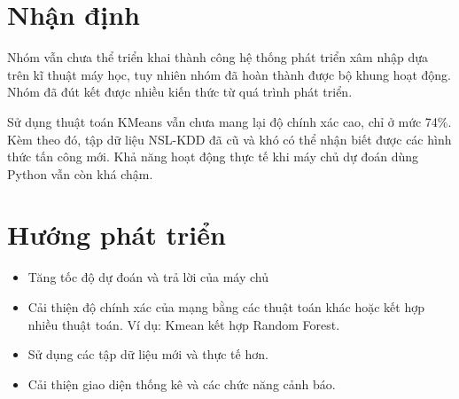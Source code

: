 \section{Nhận định}
Nhóm vẫn chưa thể triển khai thành công hệ thống phát triển xâm nhập dựa trên kĩ thuật máy học, tuy nhiên 
nhóm đã hoàn thành được bộ khung hoạt động. Nhóm đã đút kết được nhiều kiến thức từ quá trình phát triển.
\par
Sử dụng thuật toán KMeans vẫn chưa mang lại độ chính xác cao, chỉ ở mức 74\%. Kèm theo đó, tập dữ liệu NSL-KDD đã cũ
và khó có thể nhận biết được các hình thức tấn công mới. Khả năng hoạt động thực tế khi máy chủ dự đoán dùng Python
vẫn còn khá chậm.
\section{Hướng phát triển}
\begin{itemize}
    \item Tăng tốc độ dự đoán và trả lời của máy chủ
	\item Cải thiện độ chính xác của mạng bằng các thuật toán khác hoặc kết hợp nhiều thuật toán.
	      Ví dụ: Kmean kết hợp Random Forest.
    \item Sử dụng các tập dữ liệu mới và thực tế hơn.
    \item Cải thiện giao diện thống kê và các chức năng cảnh báo.
\end{itemize}
